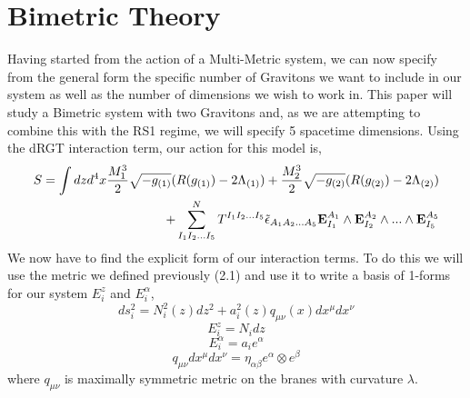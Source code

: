\documentclass[11pt]{report}
\numberwithin{equation}{chapter}
\begin{document}
\section{Bimetric Theory}
Having started from the action of a Multi-Metric system, we can now specify from the general form the specific number of Gravitons we want to include in our system as well as the number of dimensions we wish to work in. This paper will study a Bimetric system with two Gravitons and, as we are attempting to combine this with the RS1 regime, we will specify 5 spacetime dimensions. Using the dRGT interaction term, our action for this model is\cite{Hinterbichler:2012cn},
\begin{align}
    S = \int dzd^4x\frac{M_1^{3}}{2}\sqrt{-g_{(1)}}(R(g_{(1)})-2\Lambda_{(1)}) + \frac{M_2^{3}}{2}\sqrt{-g_{(2)}}(R(g_{(2)})-2\Lambda_{(2)})\\ \nonumber+\sum^N_{I_1I_2...I_5}T^{I_1I_2...I_5}\Tilde{\epsilon}_{A_1A_2...A_5}\bold{E}_{I_1}^{A_1}\wedge\bold{E}_{I_2}^{A_2}\wedge ...\wedge\bold{E}_{I_5}^{A_5}
\end{align}
We now have to find the explicit form of our interaction terms. To do this we will use the metric we defined previously (2.1) and use it to write a basis of 1-forms for our system $E^z_i$ and $E^\alpha_i$,
\begin{equation}
ds^2_i=N^2_i\left(z\right)dz^2+a^2_i\left(z\right)q_{\mu\nu}\left(x\right)dx^\mu dx^\nu
\end{equation}
\begin{equation}
    E^z_i=N_idz 
\end{equation}
\begin{equation}
    E^\alpha_i=a_ie^\alpha 
\end{equation}
\begin{equation}
    q_{\mu\nu}dx^\mu dx^\nu=\eta_{\alpha \beta}e^\alpha \otimes e^\beta
\end{equation}
where $q_{\mu\nu}$ is maximally symmetric metric on the branes with curvature $\lambda$.\\
\end{document}
